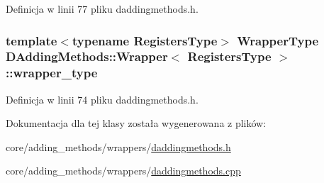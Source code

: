 Definicja w linii 77 pliku daddingmethods.\-h.

\hypertarget{class_d_adding_methods_1_1_wrapper_aaa1e1c8e0902c6241c714498dc9e5316}{
\subsubsection[{wrapper\-\_\-type}]{\setlength{\rightskip}{0pt plus 5cm}template$<$typename Registers\-Type$>$ {\bf Wrapper\-Type} {\bf D\-Adding\-Methods\-::\-Wrapper}$<$ Registers\-Type $>$\-::wrapper\-\_\-type}}\label{class_d_adding_methods_1_1_wrapper_aaa1e1c8e0902c6241c714498dc9e5316}


Definicja w linii 74 pliku daddingmethods.\-h.



Dokumentacja dla tej klasy została wygenerowana z plików\-:\begin{DoxyCompactItemize}
\item 
core/adding\-\_\-methods/wrappers/\hyperlink{daddingmethods_8h}{daddingmethods.\-h}\item 
core/adding\-\_\-methods/wrappers/\hyperlink{daddingmethods_8cpp}{daddingmethods.\-cpp}\end{DoxyCompactItemize}
